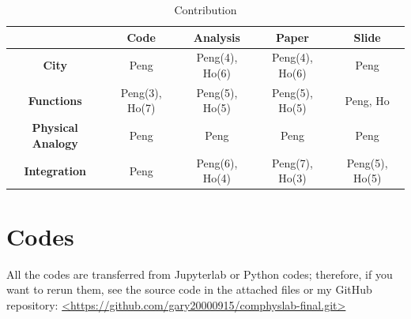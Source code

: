 \documentclass[10pt]{article}
\begin{document}
\begin{multicols}{2}
\begin{thebibliography}{1}
\end{thebibliography}

\end{multicols}

\clearpage

\begin{table}[]
\centering
\caption{Contribution}
\label{con}
    \begin{tabular}{c|cccc}
                                  & \textbf{Code}  & \textbf{Analysis} & \textbf{Paper} & \textbf{Slide} \\ \hline
        \textbf{City}             & Peng           & Peng(4), Ho(6)    & Peng(4), Ho(6) & Peng           \\ \hline
        \textbf{Functions}        & Peng(3), Ho(7) & Peng(5), Ho(5)    & Peng(5), Ho(5) & Peng, Ho             \\ \hline
        \textbf{Physical Analogy} & Peng           & Peng              & Peng           & Peng           \\ \hline
        \textbf{Integration}      & Peng           & Peng(6), Ho(4)    & Peng(7), Ho(3) & Peng(5), Ho(5)
    \end{tabular}
\end{table}

\section*{\Large{Codes}}
    All the codes are transferred from Jupyterlab or Python codes; therefore, if you want to rerun them, see the source code in the attached files or my GitHub repository:
    \noindent\center\url{<https://github.com/gary20000915/comphyslab-final.git>}
\end{document}
